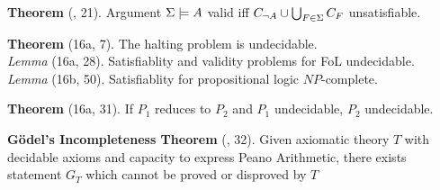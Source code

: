 \documentclass[class=cs245,nogeometry]{agony}
\newcommand{\thm}[3][Theorem]{\textbf{#1} (\textsection #2, #3).}
\newcommand{\lem}[2]{\textit{Lemma} (\textsection #1, #2).}
\begin{document}
\begin{multicols}{2}
  \thm{15}{21} Argument $\Sigma \models A$ valid iff $C_{\lnot A} \cup \bigcup_{F\in \Sigma}C_F$ unsatisfiable.

  \thm{16a}{7} The halting problem is undecidable. \\
  \lem{16a}{28} Satisfiablity and validity problems for FoL undecidable. \\
  \lem{16b}{50} Satisfiablity for propositional logic $NP$-complete.

  \thm{16a}{31} If $P_1$ reduces to $P_2$ and $P_1$ undecidable, $P_2$ undecidable.
  
  \thm[G\"odel's Incompleteness Theorem]{17}{32} Given axiomatic theory $T$
  with decidable axioms and capacity to express Peano Arithmetic,
  there exists statement $G_T$ which cannot be proved or disproved by $T$
\end{multicols}
\end{document}
